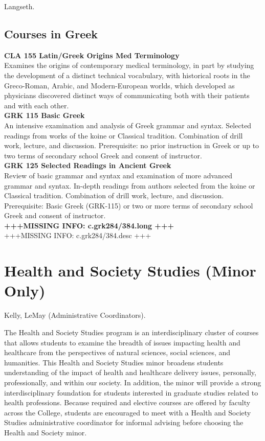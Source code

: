 \documentclass[
  letterpaper,
]{scrbook}
\begin{document}
Langseth.

\subsection{Courses in Greek}\label{courses-in-greek}

\textbf{CLA 155 Latin/Greek Origins Med Terminology}\\
Examines the origins of contemporary medical terminology, in part by
studying the development of a distinct technical vocabulary, with
historical roots in the Greco-Roman, Arabic, and Modern-European worlds,
which developed as physicians discovered distinct ways of communicating
both with their patients and with each other.\\
\textbf{GRK 115 Basic Greek}\\
An intensive examination and analysis of Greek grammar and syntax.
Selected readings from works of the koine or Classical tradition.
Combination of drill work, lecture, and discussion. Prerequisite: no
prior instruction in Greek or up to two terms of secondary school Greek
and consent of instructor.\\
\textbf{GRK 125 Selected Readings in Ancient Greek}\\
Review of basic grammar and syntax and examination of more advanced
grammar and syntax. In-depth readings from authors selected from the
koine or Classical tradition. Combination of drill work, lecture, and
discussion. Prerequisite: Basic Greek (GRK-115) or two or more terms of
secondary school Greek and consent of instructor.\\
\textbf{+++MISSING INFO: c.grk284/384.long +++}\\
+++MISSING INFO: c.grk284/384.desc +++

\section{Health and Society Studies (Minor
Only)}\label{sec-health-and-society-studies}

Kelly, LeMay (Administrative Coordinators).

The Health and Society Studies program is an interdisciplinary cluster
of courses that allows students to examine the breadth of issues
impacting health and healthcare from the perspectives of natural
sciences, social sciences, and humanities. This Health and Society
Studies minor broadens students understanding of the impact of health
and healthcare delivery issues, personally, professionally, and within
our society. In addition, the minor will provide a strong
interdisciplinary foundation for students interested in graduate studies
related to health professions. Because required and elective courses are
offered by faculty across the College, students are encouraged to meet
with a Health and Society Studies administrative coordinator for
informal advising before choosing the Health and Society minor.
\end{document}

